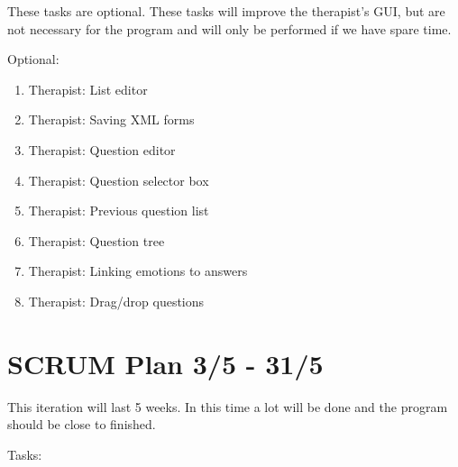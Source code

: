 These tasks are optional. These tasks will improve the therapist’s GUI, but are not necessary for the program and will only be performed if we have spare time.

Optional:
\begin{enumerate}
\item 	Therapist: List editor
\item	Therapist: Saving XML forms
\item	Therapist: Question editor
\item	Therapist: Question selector box
\item	Therapist: Previous question list
\item	Therapist: Question tree
\item	Therapist: Linking emotions to answers
\item	Therapist: Drag/drop questions
\end{enumerate}

\section*{SCRUM Plan 3/5 - 31/5}
This iteration will last 5 weeks. In this time a lot will be done and the program should be close to finished. 

Tasks:

